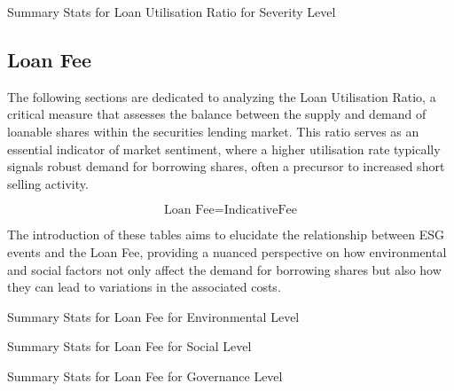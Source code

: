 \begin{table}[H]
\caption{Summary Stats for Loan Utilisation Ratio for Severity Level}
\centering
\resizebox{\textwidth}{!}{

}
\label{table:loan_utilisation_ratio_severity.tex}
\end{table}


\subsection{Loan Fee}

The following sections are dedicated to analyzing the Loan Utilisation Ratio, a critical measure that assesses the balance between the supply and demand of loanable shares within the securities lending market. This ratio serves as an essential indicator of market sentiment, where a higher utilisation rate typically signals robust demand for borrowing shares, often a precursor to increased short selling activity.

 \begin{equation}
	\text{Loan Fee} = \text{IndicativeFee}
	\label{eq:Loan_Fee}
\end{equation}

The introduction of these tables aims to elucidate the relationship between ESG events and the Loan Fee, providing a nuanced perspective on how environmental and social factors not only affect the demand for borrowing shares but also how they can lead to variations in the associated costs.

\begin{table}[H]
\caption{Summary Stats for Loan Fee for Environmental Level}
\centering
\resizebox{\textwidth}{!}{

}
\label{table:loan_fee_environment.tex}
\end{table}

\begin{table}[H]
\caption{Summary Stats for Loan Fee for Social Level}
\centering
\resizebox{\textwidth}{!}{

}
\label{table:loan_fee_social.tex}
\end{table}

\begin{table}[H]
\caption{Summary Stats for Loan Fee for Governance Level}
\centering
\resizebox{\textwidth}{!}{

}
\label{table:loan_fee_governance.tex}
\end{table}


